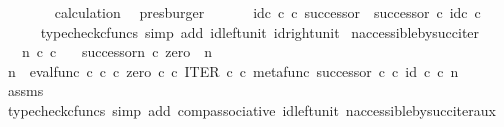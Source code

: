 \begin{isabellebody}
\ \ \ \ \ \ \isamarkupfalse%
\ calculation\ \isamarkupfalse%
\ presburger\isanewline
\ \ \isamarkupfalse%
\isanewline
\ \ \isamarkupfalse%
\ {\isachardoublequoteopen}id\isactrlsub c\ {\isasymnat}\isactrlsub c\ {\isasymcirc}\isactrlsub c\ successor\ {\isacharequal}{\kern0pt}\ successor\ {\isasymcirc}\isactrlsub c\ id\isactrlsub c\ {\isasymnat}\isactrlsub c{\isachardoublequoteclose}\isanewline
\ \ \ \ \isamarkupfalse%
\ {\isacharparenleft}{\kern0pt}typecheck{\isacharunderscore}{\kern0pt}cfuncs{\isacharcomma}{\kern0pt}\ simp\ add{\isacharcolon}{\kern0pt}\ id{\isacharunderscore}{\kern0pt}left{\isacharunderscore}{\kern0pt}unit{}\ id{\isacharunderscore}{\kern0pt}right{\isacharunderscore}{\kern0pt}unit{}{\isacharparenright}{\kern0pt}\isanewline
{}\isamarkupfalse%
%
\endisatagproof
{\isafoldproof}%
%
\isadelimproof
\isanewline
%
\endisadelimproof
\isanewline
{}\isamarkupfalse%
\ n{\isacharunderscore}{\kern0pt}accessible{\isacharunderscore}{\kern0pt}by{\isacharunderscore}{\kern0pt}succ{\isacharunderscore}{\kern0pt}iter{\isacharcolon}{\kern0pt}\isanewline
\ \ \ {\isachardoublequoteopen}n\ {\isasymin}\isactrlsub c\ {\isasymnat}\isactrlsub c{\isachardoublequoteclose}\isanewline
\ \ \ {\isachardoublequoteopen}{\isacharparenleft}{\kern0pt}successor\isactrlbsup {\isasymcirc}n\isactrlesup {\isacharparenright}{\kern0pt}\ {\isasymcirc}\isactrlsub c\ zero\ {\isacharequal}{\kern0pt}\ n{\isachardoublequoteclose}\isanewline
%
\isadelimproof
%
\endisadelimproof
%
\isatagproof
{}\isamarkupfalse%
\ {\isacharminus}{\kern0pt}\ \isanewline
\ \ \isamarkupfalse%
\ {\isachardoublequoteopen}n\ {\isacharequal}{\kern0pt}\ eval{\isacharunderscore}{\kern0pt}func\ {\isasymnat}\isactrlsub c\ {\isasymnat}\isactrlsub c\ {\isasymcirc}\isactrlsub c\ {\isasymlangle}zero\ {\isasymcirc}\isactrlsub c\ {\isasymbeta}\isactrlbsub {\isasymnat}\isactrlsub c\isactrlesub {\isacharcomma}{\kern0pt}\ ITER\ {\isasymnat}\isactrlsub c\ {\isasymcirc}\isactrlsub c\ {\isasymlangle}metafunc\ successor\ {\isasymcirc}\isactrlsub c\ {\isasymbeta}\isactrlbsub {\isasymnat}\isactrlsub c\isactrlesub {\isacharcomma}{\kern0pt}\ id\ {\isasymnat}\isactrlsub c{\isasymrangle}{\isasymrangle}\ {\isasymcirc}\isactrlsub c\ n{\isachardoublequoteclose}\isanewline
\ \ \ \ \isamarkupfalse%
\ assms\ \isamarkupfalse%
\ {\isacharparenleft}{\kern0pt}typecheck{\isacharunderscore}{\kern0pt}cfuncs{\isacharcomma}{\kern0pt}\ simp\ add{\isacharcolon}{\kern0pt}\ comp{\isacharunderscore}{\kern0pt}associative{}\ id{\isacharunderscore}{\kern0pt}left{\isacharunderscore}{\kern0pt}unit{}\ n{\isacharunderscore}{\kern0pt}accessible{\isacharunderscore}{\kern0pt}by{\isacharunderscore}{\kern0pt}succ{\isacharunderscore}{\kern0pt}iter{\isacharunderscore}{\kern0pt}aux{\isacharparenright}{\kern0pt}\isanewline

\end{isabellebody}
